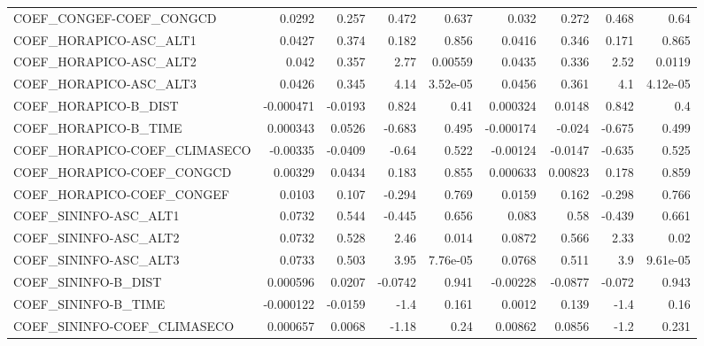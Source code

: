 \begin{tabular}{lrrrrrrrr}
COEF\_CONGEF-COEF\_CONGCD        &      0.0292 &        0.257 &   0.472 &    0.637 &      0.032 &       0.272 &        0.468 &          0.64 \\
COEF\_HORAPICO-ASC\_ALT1         &      0.0427 &        0.374 &   0.182 &    0.856 &     0.0416 &       0.346 &        0.171 &         0.865 \\
COEF\_HORAPICO-ASC\_ALT2         &       0.042 &        0.357 &    2.77 &  0.00559 &     0.0435 &       0.336 &         2.52 &        0.0119 \\
COEF\_HORAPICO-ASC\_ALT3         &      0.0426 &        0.345 &    4.14 & 3.52e-05 &     0.0456 &       0.361 &          4.1 &      4.12e-05 \\
COEF\_HORAPICO-B\_DIST           &   -0.000471 &      -0.0193 &   0.824 &     0.41 &   0.000324 &      0.0148 &        0.842 &           0.4 \\
COEF\_HORAPICO-B\_TIME           &    0.000343 &       0.0526 &  -0.683 &    0.495 &  -0.000174 &      -0.024 &       -0.675 &         0.499 \\
COEF\_HORAPICO-COEF\_CLIMASECO   &    -0.00335 &      -0.0409 &   -0.64 &    0.522 &   -0.00124 &     -0.0147 &       -0.635 &         0.525 \\
COEF\_HORAPICO-COEF\_CONGCD      &     0.00329 &       0.0434 &   0.183 &    0.855 &   0.000633 &     0.00823 &        0.178 &         0.859 \\
COEF\_HORAPICO-COEF\_CONGEF      &      0.0103 &        0.107 &  -0.294 &    0.769 &     0.0159 &       0.162 &       -0.298 &         0.766 \\
COEF\_SININFO-ASC\_ALT1          &      0.0732 &        0.544 &  -0.445 &    0.656 &      0.083 &        0.58 &       -0.439 &         0.661 \\
COEF\_SININFO-ASC\_ALT2          &      0.0732 &        0.528 &    2.46 &    0.014 &     0.0872 &       0.566 &         2.33 &          0.02 \\
COEF\_SININFO-ASC\_ALT3          &      0.0733 &        0.503 &    3.95 & 7.76e-05 &     0.0768 &       0.511 &          3.9 &      9.61e-05 \\
COEF\_SININFO-B\_DIST            &    0.000596 &       0.0207 & -0.0742 &    0.941 &   -0.00228 &     -0.0877 &       -0.072 &         0.943 \\
COEF\_SININFO-B\_TIME            &   -0.000122 &      -0.0159 &    -1.4 &    0.161 &     0.0012 &       0.139 &         -1.4 &          0.16 \\
COEF\_SININFO-COEF\_CLIMASECO    &    0.000657 &       0.0068 &   -1.18 &     0.24 &    0.00862 &      0.0856 &         -1.2 &         0.231 \\

\end{tabular}

